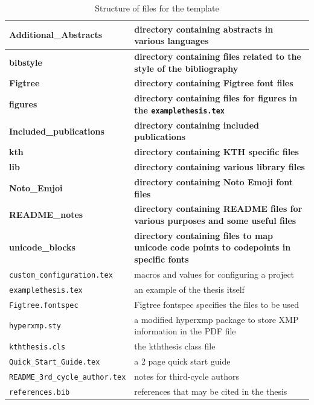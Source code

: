 \documentclass[12pt, twoside]{article}
\newcommand{\dname}[1]{\textbf{#1}}
\newcommand{\fname}[1]{\texttt{#1}}
\begin{document}
\begin{table}[!ht]
    \caption{Structure of files for the template}
    \label{tab:file_structure}
    \begin{tabular}{L{7cm}<{\footnotesize} L{6.5cm}<{\footnotesize}}
\hline
\dname{Additional\_Abstracts} & \textbf{directory containing abstracts in various languages} \\
\hline
\dname{bibstyle} & \textbf{directory containing files related to the style of the bibliography} \\
\hline
\dname{Figtree}& \textbf{directory containing Figtree font files} \\
\hline
\dname{figures} & \textbf{directory containing files for figures in the \fname{examplethesis.tex}} \\
\hline
\dname{Included\_publications} & \textbf{directory containing included publications} \\
\hline
\dname{kth} & \textbf{directory containing KTH specific files}  \\
\hline
\dname{lib} & \textbf{directory containing various library files}  \\
\hline
\dname{Noto\_Emjoi}& \textbf{directory containing Noto Emoji font files} \\
\hline
\dname{README\_notes} & \textbf{directory containing README files for various purposes and some useful files}  \\
\hline
\dname{unicode\_blocks} & \textbf{directory containing files to map unicode code points to codepoints in specific fonts}  \\
\hline
\fname{custom\_configuration.tex} & macros and values for configuring a project\\
\fname{examplethesis.tex} & an example of the thesis itself \\
\fname{Figtree.fontspec} & Figtree fontspec specifies the files to be used \\
\fname{hyperxmp.sty} & a modified hyperxmp package to store XMP information in the \gls{PDF} file \\
\fname{kththesis.cls} & the kththesis class file \\
\fname{Quick\_Start\_Guide.tex} & a 2 page quick start guide\\
\fname{README\_3rd\_cycle\_author.tex} & notes for third-cycle authors\\
\fname{references.bib} & references that may be cited in the thesis \\
\end{tabular}
\end{table}
\end{document}
